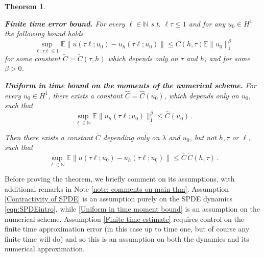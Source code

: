 \documentclass[reqno, 11pt]{amsart}
\theoremstyle{plain}
\newtheorem{theorem}{Theorem}[section]
\theoremstyle{definition}
\theoremstyle{remark}
\numberwithin{equation}{section}
\numberwithin{theorem}{section}
\newcommand{\N}{\mathbb{N}}
\begin{document}
{\begin{theorem}
\begin{enumerate}[label=\textnormal{[H\arabic*]},ref={[H\arabic*]}]
\item\label{Finite time estimate}{\bf Finite time error bound.}
For every $\ell \in \mathbb N$ s.t. $\ell\tau \leq 1$ and for any $u_0 \in H^1$ the following bound holds
\begin{equation}\label{eqn: Finite time estimate}
    \sup_{\ell: \tau \ell \leq 1} 
    \mathbb E \|u(\tau \ell;u_0) - u_h( \tau \ell;u_0)\| \leq \tilde{C}(h, \tau) \mathbb E \|u_0\|_1^{\beta}
\end{equation}
for some constant $\tilde C= \tilde C (\tau, h)$ which depends only on $\tau$ and $h$, and for some $\beta>0$.  


\item\label{Uniform in time moment bound}{\bf Uniform in time bound on the moments of the numerical scheme.}
For every $u_0 \in H^1$, there exists a constant $\hat C=\hat C(u_0)$, which depends only on $u_0$, such that
$$
\sup_{\ell \in \N} \mathbb E \|u_h(\tau\ell; u_0)\|_1^{\beta} \leq \hat C(u_0) \,.
$$
\end{enumerate}

Then there exists a constant $\bar C$ depending only on $\lambda$ and $u_0$, but not  $h, \tau $ or $ \ell$, such that 
\begin{equation}\label{UiT bound main thm}
    \sup_{\ell \in \mathbb N} 
    \mathbb E \|u(\tau \ell;u_0) - u_h(\tau \ell;u_0)\| \leq \bar C \, \tilde{C}(h, \tau) \,.
\end{equation}
\end{theorem}

Before proving the theorem, we briefly comment on its assumptions, with additional remarks in  Note \ref{note: comments on main thm}. Assumption \ref{Contractivity of SPDE} is an assumption purely on the SPDE dynamics \eqref{eqn:SPDEintro}, while \ref{Uniform in time moment bound} is an assumption on the numerical scheme. Assumption \ref{Finite time estimate} requires control on the finite time approximation error (in this case up to time one, but of course any finite time will do) and so this is an assumption on both  the dynamics and its numerical approximation. 



}
\end{document}
